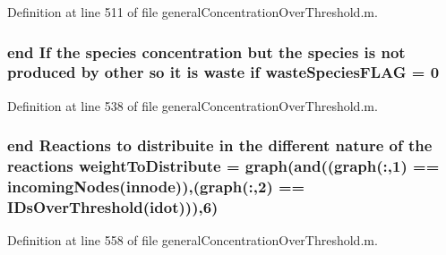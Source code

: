 Definition at line 511 of file general\-Concentration\-Over\-Threshold.\-m.

\hypertarget{a00022_a86a34d23ef767cc82038231f868cea96}{
\subsubsection[{waste\-Species\-F\-L\-A\-G}]{ {\bf end} If the {\bf species} concentration but the {\bf species} is not produced by other so it is waste {\bf if} waste\-Species\-F\-L\-A\-G = 0}}\label{a00022_a86a34d23ef767cc82038231f868cea96}


Definition at line 538 of file general\-Concentration\-Over\-Threshold.\-m.

\hypertarget{a00022_a8f29aae1a516e7b27fa97f490490b59c}{
\subsubsection[{weight\-To\-Distribute}]{ {\bf end} Reactions {\bf to} distribuite in the different nature of the {\bf reactions} weight\-To\-Distribute = {\bf graph}({\bf and}(({\bf graph}(\-:,1) == {\bf incoming\-Nodes}({\bf innode})),({\bf graph}(\-:,2) == {\bf I\-Ds\-Over\-Threshold}(idot))),6)}}\label{a00022_a8f29aae1a516e7b27fa97f490490b59c}


Definition at line 558 of file general\-Concentration\-Over\-Threshold.\-m.

